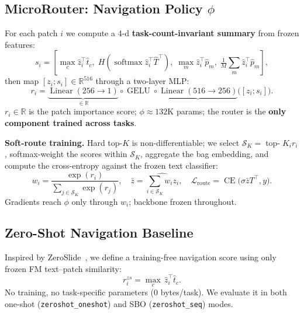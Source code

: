 \documentclass[runningheads]{llncs}
\begin{document}
\subsection{MicroRouter: Navigation Policy $\phi$}
\label{sec:router}
For each patch $i$ we compute a 4-d \textbf{task-count-invariant
summary} from frozen features:
\begin{equation}
s_i = \!\left[
  \max_c \hat{z}_i^\top \hat{t}_c,\;
  H\!\left(\operatorname{softmax}\hat{z}_i^\top \hat{T}^\top\right),\;
  \max_m \hat{z}_i^\top \hat{p}_m,\;
  \tfrac{1}{M}{\textstyle\sum}_m \hat{z}_i^\top \hat{p}_m
\right],
\label{eq:summary}
\end{equation}
then map $[z_i;s_i]\in\mathbb{R}^{516}$ through a two-layer MLP:
\begin{equation}
r_i = \underbrace{\operatorname{Linear}(256\!\to\!1)}_{\in\mathbb{R}}
      \circ\operatorname{GELU}\circ
      \underbrace{\operatorname{Linear}(516\!\to\!256)}_{}
      \bigl([z_i;s_i]\bigr).
\label{eq:router}
\end{equation}
$r_i\in\mathbb{R}$ is the patch importance score; $\phi\approx132$K
params; the router is the \textbf{only component trained across tasks}.

\noindent\textbf{Soft-route training.} Hard top-$K$ is
non-differentiable; we select $\mathcal{S}_K{=}\operatorname{top-}K_i r_i$,
softmax-weight the scores within $\mathcal{S}_K$, aggregate the bag
embedding, and compute the cross-entropy against the frozen text
classifier:
\begin{equation}
w_i{=}\frac{\exp(r_i)}{\sum_{j\in\mathcal{S}_K}\!\exp(r_j)},\quad
\bar{z}{=}\widehat{\textstyle\sum_{i\in\mathcal{S}_K}\!w_i z_i},\quad
\mathcal{L}_\text{route}{=}\operatorname{CE}\!\bigl(\sigma\bar{z}T^\top,y\bigr).
\label{eq:softroute}
\end{equation}
Gradients reach $\phi$ only through $w_i$; backbone frozen throughout.

\subsection{Zero-Shot Navigation Baseline}
\label{sec:zeroshot}
Inspired by ZeroSlide~\cite{zeroslide}, we define a training-free
navigation score using only frozen FM text--patch similarity:
\begin{equation}
r_i^{zs} = \max_c\,\hat{z}_i^\top\hat{t}_c.
\label{eq:zeroshot}
\end{equation}
No training, no task-specific parameters ($0$ bytes/task). We evaluate
it in both one-shot (\texttt{zeroshot\_oneshot}) and SBO
(\texttt{zeroshot\_seq}) modes.
\end{document}
